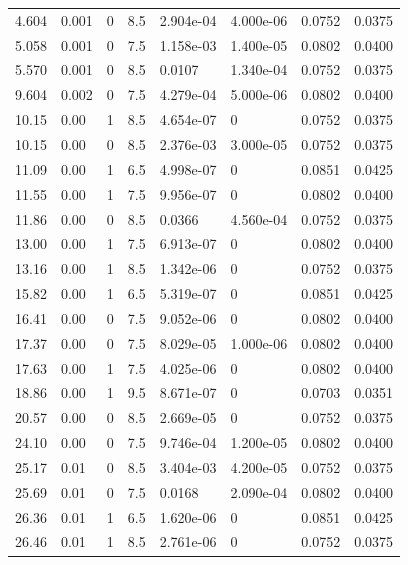 \documentclass[preview]{standalone}
\begin{document}
{{\begin{tabular}{L{1.2cm}C{1.2cm} C{0.3cm}C{0.5cm} C{1.4cm}C{1.4cm} C{1.4cm}C{1.4cm}}
  4.604  &  0.001  & 0     & 8.5 &  2.904e-04  & 4.000e-06  & 0.0752 &  0.0375   \\ 
  5.058  &  0.001  & 0     & 7.5 &  1.158e-03  & 1.400e-05  & 0.0802 &  0.0400   \\ 
  5.570  &  0.001  & 0     & 8.5 &  0.0107  & 1.340e-04  & 0.0752 &  0.0375   \\ 
  9.604  &  0.002  & 0     & 7.5 &  4.279e-04  & 5.000e-06  & 0.0802 &  0.0400   \\ 
  10.15  &  0.00  & 1     & 8.5 &  4.654e-07  & 0  & 0.0752 &  0.0375   \\ 
  10.15  &  0.00  & 0     & 8.5 &  2.376e-03  & 3.000e-05  & 0.0752 &  0.0375   \\ 
  11.09  &  0.00  & 1     & 6.5 &  4.998e-07  & 0  & 0.0851 &  0.0425   \\ 
  11.55  &  0.00  & 1     & 7.5 &  9.956e-07  & 0  & 0.0802 &  0.0400   \\ 
  11.86  &  0.00  & 0     & 8.5 &  0.0366  & 4.560e-04  & 0.0752 &  0.0375   \\ 
  13.00  &  0.00  & 1     & 7.5 &  6.913e-07  & 0  & 0.0802 &  0.0400   \\ 
  13.16  &  0.00  & 1     & 8.5 &  1.342e-06  & 0  & 0.0752 &  0.0375   \\ 
  15.82  &  0.00  & 1     & 6.5 &  5.319e-07  & 0  & 0.0851 &  0.0425   \\ 
  16.41  &  0.00  & 0     & 7.5 &  9.052e-06  & 0  & 0.0802 &  0.0400   \\ 
  17.37  &  0.00  & 0     & 7.5 &  8.029e-05  & 1.000e-06  & 0.0802 &  0.0400   \\ 
  17.63  &  0.00  & 1     & 7.5 &  4.025e-06  & 0  & 0.0802 &  0.0400   \\ 
  18.86  &  0.00  & 1     & 9.5 &  8.671e-07  & 0  & 0.0703 &  0.0351   \\ 
  20.57  &  0.00  & 0     & 8.5 &  2.669e-05  & 0  & 0.0752 &  0.0375   \\ 
  24.10  &  0.00  & 0     & 7.5 &  9.746e-04  & 1.200e-05  & 0.0802 &  0.0400   \\ 
  25.17  &  0.01  & 0     & 8.5 &  3.404e-03  & 4.200e-05  & 0.0752 &  0.0375   \\ 
  25.69  &  0.01  & 0     & 7.5 &  0.0168  & 2.090e-04  & 0.0802 &  0.0400   \\ 
  26.36  &  0.01  & 1     & 6.5 &  1.620e-06  & 0  & 0.0851 &  0.0425   \\ 
  26.46  &  0.01  & 1     & 8.5 &  2.761e-06  & 0  & 0.0752 &  0.0375   \\ 

\end{tabular}}}
\end{document}
